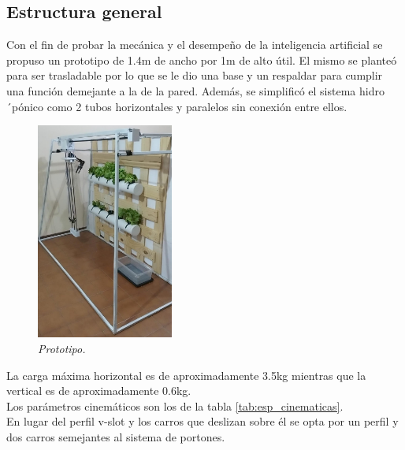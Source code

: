 \subsection{Estructura general}
Con el fin de probar la mecánica y el desempeño de la inteligencia artificial se propuso un prototipo de 1.4m de ancho por 1m de alto útil. El mismo se planteó para ser trasladable por lo que se le dio una base y un respaldar para cumplir una función demejante a la de la pared. Además, se simplificó el sistema hidro´pónico como 2 tubos horizontales y paralelos sin conexión entre ellos.
\begin{figure}[H]
    \centering
        \includegraphics[width=0.4\textwidth]{img/estructura.jpg}
        \caption{\textit{Prototipo.}}
        \label{fig:estructura}
\end{figure}
La carga máxima horizontal es de aproximadamente 3.5kg mientras que la vertical es de aproximadamente 0.6kg.\\
Los parámetros cinemáticos son los de la tabla \ref{tab:esp_cinematicas}.\\

En lugar del perfil v-slot y los carros que deslizan sobre él se opta por un perfil y dos carros semejantes al sistema de portones.\\

